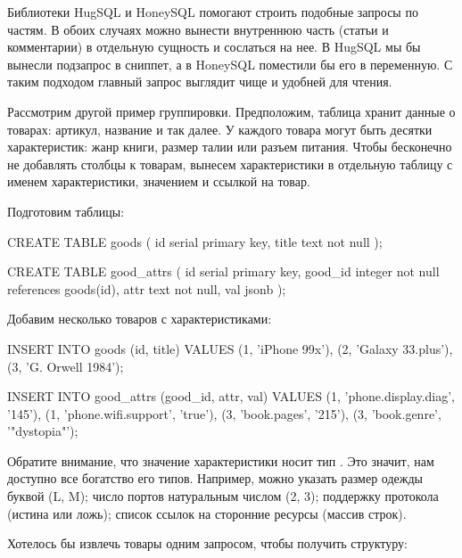 Библиотеки HugSQL и HoneySQL помогают строить подобные запросы по частям. В обоих случаях можно вынести внутреннюю часть (статьи и комментарии) в отдельную сущность и сослаться на нее. В HugSQL мы бы вынесли подзапрос в сниппет, а в HoneySQL поместили бы его в переменную. С таким подходом главный запрос выглядит чище и удобней для чтения.

Рассмотрим другой пример группировки. Предположим, таблица хранит данные о товарах: артикул, название и так далее. У каждого товара могут быть десятки характеристик: жанр книги, размер талии или разъем питания. Чтобы бесконечно не добавлять столбцы к товарам, вынесем характеристики в отдельную таблицу с именем характеристики, значением и ссылкой на товар.

Подготовим таблицы:

\begin{english}
  \begin{sql}
CREATE TABLE goods (
  id serial primary key,
  title text not null
);

CREATE TABLE good_attrs (
  id serial primary key,
  good_id integer not null references goods(id),
  attr text not null,
  val jsonb
);
  \end{sql}
\end{english}

Добавим несколько товаров с характеристиками:

\begin{english}
  \begin{sql}
INSERT INTO goods (id, title)
VALUES (1, 'iPhone 99x'),
       (2, 'Galaxy 33.plus'),
       (3, 'G. Orwell 1984');

INSERT INTO good_attrs (good_id, attr, val)
VALUES (1, 'phone.display.diag', '145'),
       (1, 'phone.wifi.support', 'true'),
       (3, 'book.pages', '215'),
       (3, 'book.genre', '"dystopia"');
  \end{sql}
\end{english}

Обратите внимание, что значение характеристики носит тип . Это значит, нам доступно все богатство его типов. Например, можно указать размер одежды буквой (L, M); число портов натуральным числом (2, 3); поддержку протокола (истина или ложь); список ссылок на сторонние ресурсы (массив строк).

Хотелось бы извлечь товары одним запросом, чтобы получить структуру:

\begin{english}
  \begin{clojure}
  \end{clojure}
\end{english}

